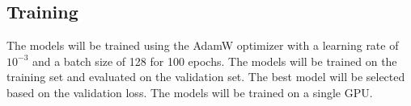 \subsection{Training}

The models will be trained using the AdamW optimizer with a learning rate of $10^{-3}$ and a batch size of 128 for 100 epochs. The models will be trained on the training set and evaluated on the validation set. The best model will be selected based on the validation loss. The models will be trained on a single GPU.
